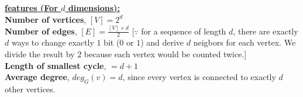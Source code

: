 \documentclass{article}
\begin{document}
{    \underline{\textbf{features (For $d$ dimensions):}}\\

    \textbf{Number of vertices}, $ [V] = 2^{d} $\\

    \textbf{Number of edges}, $ [E] = \frac{[V]\times{d}}{2} $
    [$\because$ for a sequence of length $d$, 
    there are exactly $d$ ways to change exactly $1$ bit 
    ($0$ or $1$) and derive $d$ neigbors for each vertex.
    We divide the result by $2$ because each vertex 
    would be counted twice.]\\

    \textbf{Length of smallest cycle}, $ = d+1 $\\

    \textbf{Average degree}, $ deg_{G}(v) = d $, 
    since every vertex is connected to exactly $d$ 
    other vertices.\\
    }
\end{document}
